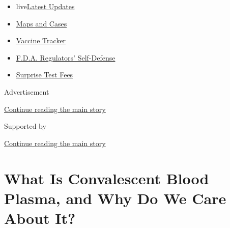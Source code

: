 \begin{itemize}
\tightlist
\item
  live\href{https://www.nytimes3xbfgragh.onion/2020/09/11/world/covid-19-coronavirus.html?name=styln-coronavirus-national\&region=TOP_BANNER\&block=storyline_menu_recirc\&action=click\&pgtype=Article\&impression_id=d24d9231-f4d2-11ea-bf97-05837a7d0676\&variant=undefined}{Latest
  Updates}
\item
  \href{https://www.nytimes3xbfgragh.onion/interactive/2020/us/coronavirus-us-cases.html?name=styln-coronavirus-national\&region=TOP_BANNER\&block=storyline_menu_recirc\&action=click\&pgtype=Article\&impression_id=d24db940-f4d2-11ea-bf97-05837a7d0676\&variant=undefined}{Maps
  and Cases}
\item
  \href{https://www.nytimes3xbfgragh.onion/interactive/2020/science/coronavirus-vaccine-tracker.html?name=styln-coronavirus-national\&region=TOP_BANNER\&block=storyline_menu_recirc\&action=click\&pgtype=Article\&impression_id=d24db941-f4d2-11ea-bf97-05837a7d0676\&variant=undefined}{Vaccine
  Tracker}
\item
  \href{https://www.nytimes3xbfgragh.onion/2020/09/10/us/politics/fda-coronavirus-vaccine.html?name=styln-coronavirus-national\&region=TOP_BANNER\&block=storyline_menu_recirc\&action=click\&pgtype=Article\&impression_id=d24db942-f4d2-11ea-bf97-05837a7d0676\&variant=undefined}{F.D.A.
  Regulators' Self-Defense}
\item
  \href{https://www.nytimes3xbfgragh.onion/2020/09/09/upshot/coronavirus-surprise-test-fees.html?name=styln-coronavirus-national\&region=TOP_BANNER\&block=storyline_menu_recirc\&action=click\&pgtype=Article\&impression_id=d24db943-f4d2-11ea-bf97-05837a7d0676\&variant=undefined}{Surprise
  Test Fees}
\end{itemize}

Advertisement

\protect\hyperlink{after-top}{Continue reading the main story}

Supported by

\protect\hyperlink{after-sponsor}{Continue reading the main story}

\hypertarget{what-is-convalescent-blood-plasma-and-why-do-we-care-about-it}{%
\section{What Is Convalescent Blood Plasma, and Why Do We Care About
It?}\label{what-is-convalescent-blood-plasma-and-why-do-we-care-about-it}}

